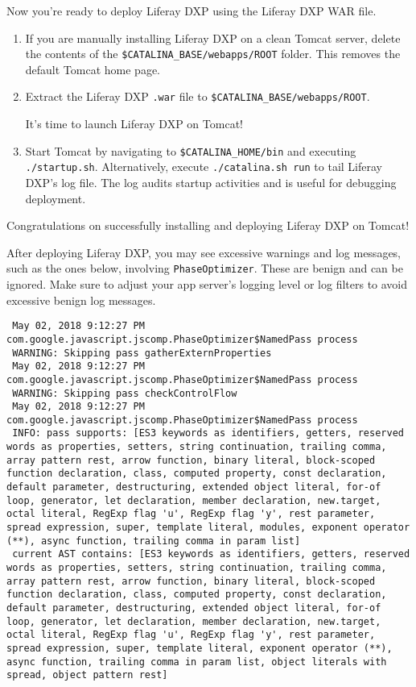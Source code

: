 Now you're ready to deploy Liferay DXP using the Liferay DXP WAR file.

\begin{enumerate}
\def\labelenumi{\arabic{enumi}.}
\item
  If you are manually installing Liferay DXP on a clean Tomcat server,
  delete the contents of the \texttt{\$CATALINA\_BASE/webapps/ROOT}
  folder. This removes the default Tomcat home page.
\item
  Extract the Liferay DXP \texttt{.war} file to
  \texttt{\$CATALINA\_BASE/webapps/ROOT}.

  It's time to launch Liferay DXP on Tomcat!
\item
  Start Tomcat by navigating to \texttt{\$CATALINA\_HOME/bin} and
  executing \texttt{./startup.sh}. Alternatively, execute
  \texttt{./catalina.sh\ run} to tail Liferay DXP's log file. The log
  audits startup activities and is useful for debugging deployment.
\end{enumerate}

Congratulations on successfully installing and deploying Liferay DXP on
Tomcat!

\noindent\hrulefill

After deploying Liferay DXP, you may see excessive warnings and log
messages, such as the ones below, involving \texttt{PhaseOptimizer}.
These are benign and can be ignored. Make sure to adjust your app
server's logging level or log filters to avoid excessive benign log
messages.

\begin{verbatim}
 May 02, 2018 9:12:27 PM com.google.javascript.jscomp.PhaseOptimizer$NamedPass process
 WARNING: Skipping pass gatherExternProperties
 May 02, 2018 9:12:27 PM com.google.javascript.jscomp.PhaseOptimizer$NamedPass process
 WARNING: Skipping pass checkControlFlow
 May 02, 2018 9:12:27 PM com.google.javascript.jscomp.PhaseOptimizer$NamedPass process
 INFO: pass supports: [ES3 keywords as identifiers, getters, reserved words as properties, setters, string continuation, trailing comma, array pattern rest, arrow function, binary literal, block-scoped function declaration, class, computed property, const declaration, default parameter, destructuring, extended object literal, for-of loop, generator, let declaration, member declaration, new.target, octal literal, RegExp flag 'u', RegExp flag 'y', rest parameter, spread expression, super, template literal, modules, exponent operator (**), async function, trailing comma in param list]
 current AST contains: [ES3 keywords as identifiers, getters, reserved words as properties, setters, string continuation, trailing comma, array pattern rest, arrow function, binary literal, block-scoped function declaration, class, computed property, const declaration, default parameter, destructuring, extended object literal, for-of loop, generator, let declaration, member declaration, new.target, octal literal, RegExp flag 'u', RegExp flag 'y', rest parameter, spread expression, super, template literal, exponent operator (**), async function, trailing comma in param list, object literals with spread, object pattern rest]
\end{verbatim}

